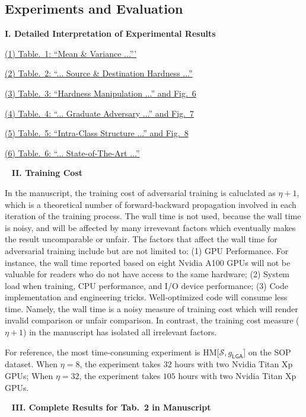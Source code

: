 \subsection{Experiments and Evaluation}

\noindent\textbf{I. Detailed Interpretation of Experimental Results}

\ul{(1) Table.~1: ``Mean \& Variance ...'''}

\ul{(2) Table.~2: ``... Source \& Destination Hardness ...''}

\ul{(3) Table.~3: ``Hardness Manipulation ...'' and Fig.~6}

\ul{(4) Table.~4: ``... Graduate Adversary ...'' and Fig.~7}

\ul{(5) Table.~5: ``Intra-Class Structure ...'' and Fig.~8}

\ul{(6) Table.~6: ``... State-of-The-Art ...''}


~\newline
\noindent\textbf{II. Training Cost}

In the manuscript, the training cost of adversarial training is caluclated as
$\eta+1$, which is a theoretical number of forward-backward propagation
involved in each iteration of the training process.
%
The wall time is not used, because the wall time is noisy, and will be affected
by many irrevevant factors which eventually makes the result uncomparable or
unfair.
%
The factors that affect the wall time for adversarial training include but are
not limited to:
%
(1) GPU Performance. For instance, the wall time reported based on eight Nvidia
A100 GPUs will not be valuable for readers who do not have access to the same
hardware;
%
(2) System load when training, CPU performance, and I/O device performance;
%
(3) Code implementation and engineering tricks. Well-optimized code will
consume less time.
%
Namely, the wall time is a noisy measure of training cost which will render
invalid comparison or unfair comparison.
%
In contrast, the training cost measure ($\eta+1$) in the manuscript has
isolated all irrelevant factors.

For reference, the most time-consuming experiment is
HM[$\mathcal{S},g_\mathsf{LGA}$] on the SOP dataset.
%
When $\eta=8$, the experiment takes $32$ hours with two Nvidia Titan Xp GPUs;
%
When $\eta=32$, the experiment takes $105$ hours with two Nvidia Titan Xp GPUs.

~\newline
\noindent\textbf{III. Complete Results for Tab.~2 in Manuscript}

